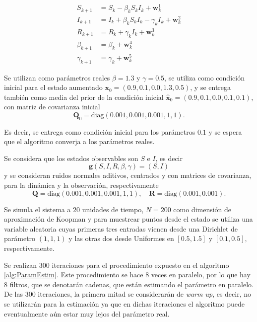 \begin{equation*}
    \begin{aligned}
        S_{k+1} &= S_k - \beta_k S_k I_k + \mathbf{w}_k^1 \\
        I_{k+1} &= I_k + \beta_k S_k I_k - \gamma_k I_k + \mathbf{w}_k^2 \\
        R_{k+1} &= R_k + \gamma_k I_k + \mathbf{w}_k^3 \\
        \beta_{k+1} &= \beta_k + \mathbf{w}_k^4 \\
        \gamma_{k+1} &= \gamma_k + \mathbf{w}_k^5
    \end{aligned}
\end{equation*}

Se utilizan como parámetros reales $\beta=1.3$ y $\gamma=0.5$, se utiliza como condición inicial para el estado aumentado $\mathbf{x}_0 = (0.9, 0.1, 0.0, 1.3, 0.5)$, y se entrega también como media del prior de la condición inicial $\hat{\mathbf{x}}_0 = (0.9, 0.1, 0.0, 0.1, 0.1)$, con matriz de covarianza inicial
\begin{equation*}
    \mathbf{Q}_0 = \text{diag}(0.001, 0.001, 0.001, 1, 1).
\end{equation*}

Es decir, se entrega como condición inicial para los parámetros $0.1$ y se espera que el algoritmo converja a los parámetros reales. 

Se considera que los estados observables son $S$ e $I$, es decir
\begin{equation*}
    \mathbf{g}(S, I, R, \beta, \gamma) = (S, I)
\end{equation*}
y se consideran ruidos normales aditivos, centrados y con matrices de covarianza, para la dinámica y la observación, respectivamente
\begin{equation*}
    \mathbf{Q} = \text{diag}(0.001, 0.001, 0.001, 1, 1), \quad \mathbf{R} = \text{diag}(0.001, 0.001).
\end{equation*}

Se simula el sistema a $20$ unidades de tiempo, $N=200$ como dimensión de aproximación de Koopman y para muestrear puntos desde el estado se utiliza una variable aleatoria cuyas primeras tres entradas vienen desde una Dirichlet de parámetro $(1,1,1)$ y las otras dos desde Uniformes en $[0.5, 1.5]$ y $[0.1, 0.5]$, respectivamente. 

Se realizan $300$ iteraciones para el procedimiento expuesto en el algoritmo \ref{alg:ParamEstim}. Este procedimiento se hace $8$ veces en paralelo, por lo que hay $8$ filtros, que se denotarán cadenas, que están estimando el parámetro en paralelo. De las $300$ iteraciones, la primera mitad se considerarán de \textit{warm up}, es decir, no se utilizarán para la estimación ya que en dichas iteraciones el algoritmo puede eventualmente aún estar muy lejos del parámetro real.

